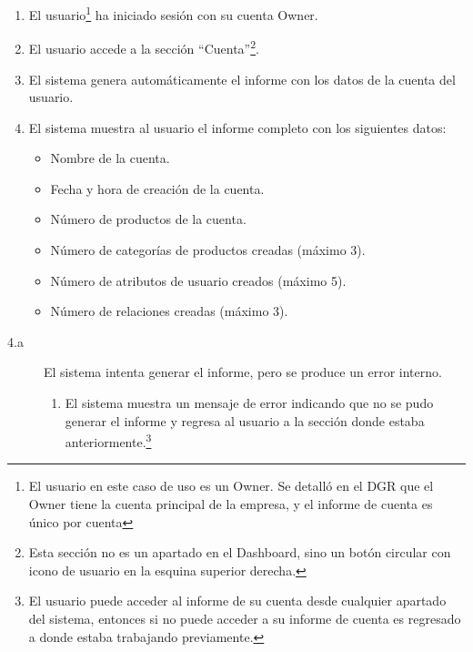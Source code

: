 \begin{enumerate}
    \item El usuario\footnote{El usuario en este caso de uso es un Owner. Se detalló en el DGR que el Owner tiene la cuenta principal de la empresa, y el informe de cuenta es único por cuenta} ha iniciado sesión con su cuenta Owner.
    \item El usuario accede a la sección \enquote{Cuenta}\footnote{Esta sección no es un apartado en el Dashboard, sino un botón circular con icono de usuario en la esquina superior derecha.}.
    \item El sistema genera automáticamente el informe con los datos de la cuenta del usuario.
    \item El sistema muestra al usuario el informe completo con los siguientes datos:
        \begin{itemize}
            \item Nombre de la cuenta.
            \item Fecha y hora de creación de la cuenta.
            \item Número de productos de la cuenta.
            \item Número de categorías de productos creadas (máximo 3).
            \item Número de atributos de usuario creados (máximo 5).
            \item Número de relaciones creadas (máximo 3).
        \end{itemize}
\end{enumerate}

\newpage %

\begin{description}        
    \item[4.a] El sistema intenta generar el informe, pero se produce un error interno.
    \begin{enumerate}
        \item[4.a.1] El sistema muestra un mensaje de error indicando que no se pudo generar el informe y regresa al usuario a la sección donde estaba anteriormente.\footnote{El usuario puede acceder al informe de su cuenta desde cualquier apartado del sistema, entonces si no puede acceder a su informe de cuenta es regresado a donde estaba trabajando previamente.}
    \end{enumerate}
\end{description}

